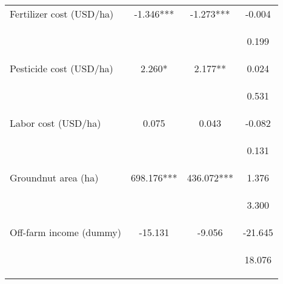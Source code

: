 \begin{center}
\begin{tabular}{lccc}
Fertilizer cost (USD/ha) & -1.346*** & -1.273*** & -0.004 \\
\vspace{4pt} & \begin{footnotesize}\end{footnotesize} & \begin{footnotesize}\end{footnotesize} & \begin{footnotesize}0.199\end{footnotesize} \\
Pesticide cost (USD/ha) & 2.260* & 2.177** & 0.024 \\
\vspace{4pt} & \begin{footnotesize}\end{footnotesize} & \begin{footnotesize}\end{footnotesize} & \begin{footnotesize}0.531\end{footnotesize} \\
Labor cost (USD/ha) & 0.075 & 0.043 & -0.082 \\
\vspace{4pt} & \begin{footnotesize}\end{footnotesize} & \begin{footnotesize}\end{footnotesize} & \begin{footnotesize}0.131\end{footnotesize} \\
Groundnut area (ha) & 698.176*** & 436.072*** & 1.376 \\
\vspace{4pt} & \begin{footnotesize}\end{footnotesize} & \begin{footnotesize}\end{footnotesize} & \begin{footnotesize}3.300\end{footnotesize} \\
Off-farm income (dummy) & -15.131 & -9.056 & -21.645 \\
\vspace{4pt} & \begin{footnotesize}\end{footnotesize} & \begin{footnotesize}\end{footnotesize} & \begin{footnotesize}18.076\end{footnotesize} \\

\end{tabular}
\end{center}
